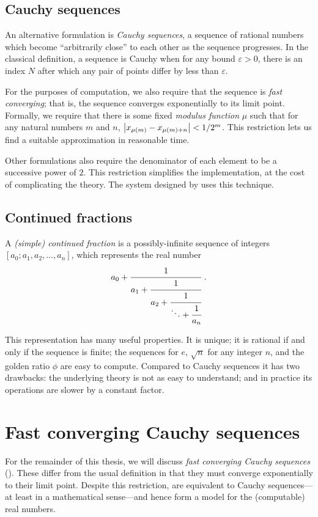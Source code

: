 \documentclass[leqno]{report}
\begin{document}
\section{Cauchy sequences}

An alternative formulation is \textit{Cauchy sequences}, a sequence of rational numbers which become ``arbitrarily close'' to each other as the sequence progresses. In the classical definition, a sequence is Cauchy when for any bound $\varepsilon > 0$, there is an index $N$ after which any pair of points differ by less than $\varepsilon$.

For the purposes of computation, we also require that the sequence is \textit{fast converging}; that is, the sequence converges exponentially to its limit point. Formally, we require that there is some fixed \textit{modulus function} $\mu$ such that for any natural numbers $m$ and $n$, $\left| x_{\mu(m)} - x_{\mu(m)+n} \right| < 1/2^m$. This restriction lets us find a suitable approximation in reasonable time.

Other formulations also require the denominator of each element to be a successive power of $2$. This restriction simplifies the implementation, at the cost of complicating the theory. The system designed by \citet{gowland2000correctness} uses this technique.

\section{Continued fractions}

A \textit{(simple) continued fraction} is a possibly-infinite sequence of integers $[a_0; a_1, a_2, \ldots, a_n]$, which represents the real number
\[
    a_0 + \cfrac{1}{a_1 + \cfrac{1}{a_2 + \cfrac{1}{\ddots + \cfrac{1}{a_n}}}}
    \ .
\]

This representation has many useful properties. It is unique; it is rational if and only if the sequence is finite; the sequences for $e$, $\sqrt{n}$ for any integer $n$, and the golden ratio $\phi$ are easy to compute. Compared to Cauchy sequences it has two drawbacks: the underlying theory is not as easy to understand; and in practice its operations are slower by a constant factor.

\chapter{Fast converging Cauchy sequences}

For the remainder of this thesis, we will discuss \textit{fast converging Cauchy sequences} (\FCCS). These differ from the usual definition in that they must converge exponentially to their limit point. Despite this restriction, \FCCS{} are equivalent to Cauchy sequences---at least in a mathematical sense---and hence form a model for the (computable) real numbers.
\end{document}
